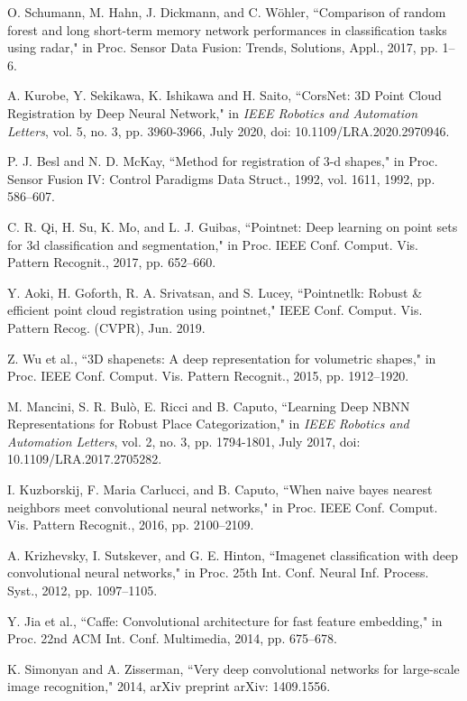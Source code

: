 \documentclass[letterpaper,12pt]{article}
\begin{document}
\begin{thebibliography}{99}
\bibitem{} O. Schumann, M. Hahn, J. Dickmann, and C. Wöhler, ``Comparison
of random forest and long short-term memory network performances in
classification tasks using radar," in Proc. Sensor Data Fusion: Trends,
Solutions, Appl., 2017, pp. 1--6.

\bibitem{} A. Kurobe, Y. Sekikawa, K. Ishikawa and H. Saito, ``CorsNet: 3D
Point Cloud Registration by Deep Neural Network," in \emph{IEEE Robotics
	and Automation Letters}, vol. 5, no. 3, pp. 3960-3966, July 2020, doi:
10.1109/LRA.2020.2970946.

\bibitem{} P. J. Besl and N. D. McKay, ``Method for registration of 3-d
shapes," in Proc. Sensor Fusion IV: Control Paradigms Data Struct.,
1992, vol. 1611, 1992, pp. 586--607.

\bibitem{} C. R. Qi, H. Su, K. Mo, and L. J. Guibas, ``Pointnet: Deep
learning on point sets for 3d classification and segmentation," in Proc.
IEEE Conf. Comput. Vis. Pattern Recognit., 2017, pp. 652--660.

\bibitem{} Y. Aoki, H. Goforth, R. A. Srivatsan, and S. Lucey,
``Pointnetlk: Robust \& efficient point cloud registration using
pointnet," IEEE Conf. Comput. Vis. Pattern Recog. (CVPR), Jun. 2019.

\bibitem{} Z. Wu et al., ``3D shapenets: A deep representation for
volumetric shapes," in Proc. IEEE Conf. Comput. Vis. Pattern Recognit.,
2015, pp. 1912--1920.

\bibitem{} M. Mancini, S. R. Bulò, E. Ricci and B. Caputo, ``Learning Deep
NBNN Representations for Robust Place Categorization," in \emph{IEEE
	Robotics and Automation Letters}, vol. 2, no. 3, pp. 1794-1801, July
2017, doi: 10.1109/LRA.2017.2705282.

\bibitem{} I. Kuzborskij, F. Maria Carlucci, and B. Caputo, ``When naive
bayes nearest neighbors meet convolutional neural networks," in Proc.
IEEE Conf. Comput. Vis. Pattern Recognit., 2016, pp. 2100--2109.

\bibitem{} A. Krizhevsky, I. Sutskever, and G. E. Hinton, ``Imagenet
classification with deep convolutional neural networks," in Proc. 25th
Int. Conf. Neural Inf. Process. Syst., 2012, pp. 1097--1105.

\bibitem{} Y. Jia et al., ``Caffe: Convolutional architecture for fast
feature embedding," in Proc. 22nd ACM Int. Conf. Multimedia, 2014, pp.
675--678.

\bibitem{} K. Simonyan and A. Zisserman, ``Very deep convolutional networks
for large-scale image recognition," 2014, arXiv preprint arXiv:
1409.1556.


\end{thebibliography}
\end{document}
